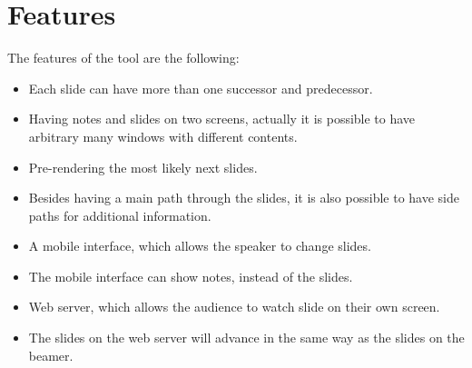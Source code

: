     \section{Features}
    
    The features of the tool are the following:\\
    \begin{itemize}
        \item Each slide can have more than one successor and predecessor.
        \item Having notes and slides on two screens, actually it is possible to have arbitrary many windows with different contents.
        \item Pre-rendering the most likely next slides.
        \item Besides having a main path through the slides, it is also possible to have side paths for additional information. 
        \item A mobile interface, which allows the speaker to change slides.
        \item The mobile interface can show notes, instead of the slides.
        \item Web server, which allows the audience to watch slide on their own screen.
        \item The slides on the web server will advance in the same way as the slides on the beamer.
    \end{itemize}

